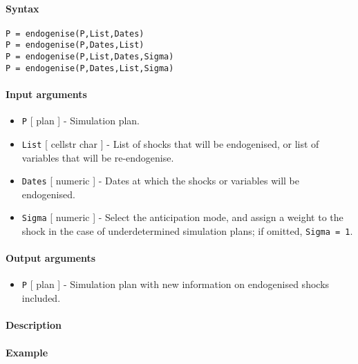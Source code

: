 


	\paragraph{Syntax}

\begin{verbatim}
P = endogenise(P,List,Dates)
P = endogenise(P,Dates,List)
P = endogenise(P,List,Dates,Sigma)
P = endogenise(P,Dates,List,Sigma)
\end{verbatim}

\paragraph{Input arguments}

\begin{itemize}
\item
  \texttt{P} {[} plan {]} - Simulation plan.
\item
  \texttt{List} {[} cellstr \textbar{} char {]} - List of shocks that
  will be endogenised, or list of variables that will be re-endogenise.
\item
  \texttt{Dates} {[} numeric {]} - Dates at which the shocks or
  variables will be endogenised.
\item
  \texttt{Sigma} {[} numeric {]} - Select the anticipation mode, and
  assign a weight to the shock in the case of underdetermined simulation
  plans; if omitted, \texttt{Sigma = 1}.
\end{itemize}

\paragraph{Output arguments}

\begin{itemize}
\itemsep1pt\parskip0pt
\item
  \texttt{P} {[} plan {]} - Simulation plan with new information on
  endogenised shocks included.
\end{itemize}

\paragraph{Description}

\paragraph{Example}


